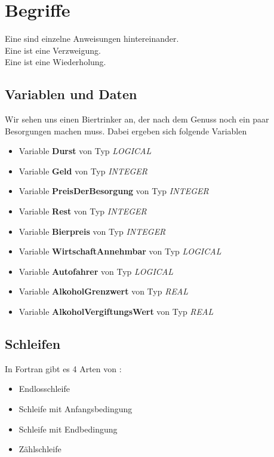 \section{Begriffe}

Eine  sind einzelne Anweisungen hintereinander. \\
Eine  ist eine Verzweigung. \\
Eine  ist eine Wiederholung.

\subsection{Variablen und Daten}

Wir sehen uns einen Biertrinker an, der nach dem Genuss noch ein paar Besorgungen machen muss. Dabei ergeben sich folgende Variablen
\begin{itemize}
	\item Variable \textbf{Durst} von Typ \textit{LOGICAL}
	\item Variable \textbf{Geld} von Typ \textit{INTEGER}
	\item Variable \textbf{PreisDerBesorgung} von Typ \textit{INTEGER}
	\item Variable \textbf{Rest} von Typ \textit{INTEGER}
	\item Variable \textbf{Bierpreis} von Typ \textit{INTEGER}
	\item Variable \textbf{WirtschaftAnnehmbar} von Typ \textit{LOGICAL}
	\item Variable \textbf{Autofahrer} von Typ \textit{LOGICAL}
	\item Variable \textbf{AlkoholGrenzwert} von Typ \textit{REAL}
	\item Variable \textbf{AlkoholVergiftungsWert} von Typ \textit{REAL}
\end{itemize}

\subsection{Schleifen}

In Fortran gibt es 4 Arten von :
\begin{itemize}
	\item Endlosschleife
	\item Schleife mit Anfangsbedingung
	\item Schleife mit Endbedingung
	\item Zählschleife
\end{itemize}

